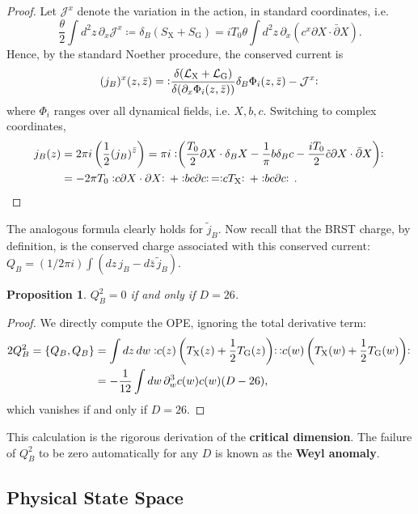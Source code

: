 \documentclass{report}
\theoremstyle{plain}
\newtheorem{proposition}[theorem]{Proposition}
\theoremstyle{definition}
\theoremstyle{remark}
\newcommand{\di}{\partial}
\newcommand{\NO}[1]{\vcentcolon\mathrel{#1}\vcentcolon\,}
\newcommand{\cJ}{\mathcal{J}}
\newcommand{\cL}{\mathcal{L}}
\newcommand{\fder}[2]{\frac{\delta #1}{\delta #2}}
\newcommand{\bdi}{\bar{\di}}
\begin{document}
\begin{proof}
  Let $\cJ^x$ denote the variation in the action, in standard
  coordinates, i.e.
  \[ \frac{\theta}{2} \int d^2z \, \di_x \cJ^x \coloneqq \delta_B(S_{\text{X}} + S_{\text{G}}) = iT_0\theta \int d^2z \, \di_x(c^x \di X \cdot \bdi X). \]
  Hence, by the standard Noether procedure, the conserved current is
  \[ (j_B)^x(z,\bar{z}) = \; \NO{\fder{(\cL_{\text{X}} + \cL_{\text{G}})}{(\di_x \Phi_i(z,\bar{z}))} \delta_B \Phi_i(z,\bar{z}) - \cJ^x} \]
  where $\Phi_i$ ranges over all dynamical fields, i.e. $X, b, c$.
  Switching to complex coordinates,
  \begin{align*}
    j_B(z) &= 2\pi i \left(\frac{1}{2} (j_B)^{\bar{z}}\right) = \pi i \NO{\left(\frac{T_0}{2} \di X \cdot \delta_B X - \frac{1}{\pi} b \delta_B c - \frac{iT_0}{2} \tilde{c} \di X \cdot \bdi X\right)} \\
    &= -2\pi T_0 \NO{c \di X \cdot \di X} + \NO{bc \di c} = \NO{c T_{\text{X}}} + \NO{bc \di c}. \qedhere
  \end{align*}
\end{proof}

The analogous formula clearly holds for $\tilde{j}_B$. Now recall that
the BRST charge, by definition, is the conserved charge associated
with this conserved current: $Q_B = (1/2\pi i) \int (dz \, j_B -
d\bar{z} \, \tilde{j}_B)$.

\begin{proposition}
  $Q_B^2 = 0$ if and only if $D = 26$.
\end{proposition}

\begin{proof}
  We directly compute the OPE, ignoring the total derivative term:
  \begin{align*}
    2Q_B^2 = \{Q_B, Q_B\}
    &= \int dz \, dw \NO{c(z) \left(T_{\text{X}}(z) + \frac{1}{2} T_{\text{G}}(z)\right)} \NO{c(w) \left(T_{\text{X}}(w) + \frac{1}{2} T_{\text{G}}(w)\right)} \\
    &= -\frac{1}{12} \int dw \, \di_w^3c(w) c(w) (D - 26),
  \end{align*}
  which vanishes if and only if $D = 26$.
\end{proof}

This calculation is the rigorous derivation of the {\bf critical
  dimension}. The failure of $Q_B^2$ to be zero automatically for any
$D$ is known as the {\bf Weyl anomaly}.

\subsection{Physical State Space}
\end{document}
